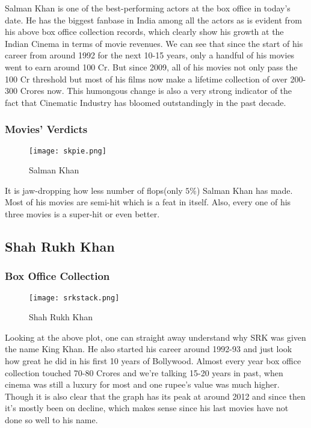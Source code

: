 \documentclass[12pt]{article}
\begin{document}
Salman Khan is one of the best-performing actors at the box office in today's date. He has the biggest fanbase in India among all the actors as is evident from his above box office collection records, which clearly show his growth at the Indian Cinema in terms of movie revenues. 
\newline
\newline
We can see that since the start of his career from around 1992 for the next 10-15 years, only a handful of his movies went to earn around 100 Cr. But since 2009, all of his movies not only pass the 100 Cr threshold but most of his films now make a lifetime collection of over 200-300 Crores now. This humongous change is also a very strong indicator of the fact that Cinematic Industry has bloomed outstandingly in the past decade. 

\subsubsection{Movies' Verdicts}

\begin{figure}[h]
    \texttt{[image: skpie.png]}
    \caption{Salman Khan}
    \label{fig:Verdict}
\end{figure}

It is jaw-dropping how less number of flops(only $5\%$) Salman Khan has made. Most of his movies are semi-hit which is a feat in itself.
Also, every one of his three movies is a super-hit or even better. 
\clearpage

\subsection{Shah Rukh Khan}

\subsubsection{Box Office Collection}

\begin{figure}[h]
    \texttt{[image: srkstack.png]}
    \caption{Shah Rukh Khan}
    \label{fig:BOC}
\end{figure}

Looking at the above plot, one can straight away understand why SRK was given the name King Khan. He also started his career around 1992-93 and just look how great he did in his first 10 years of Bollywood. Almost every year box office collection touched 70-80 Crores and we're talking 15-20 years in past, when cinema was still a luxury for most and one rupee's value was much higher. 
\newline
\newline
Though it is also clear that the graph has its peak at around 2012 and since then it's mostly been on decline, which makes sense since his last movies have not done so well to his name. 
\end{document}
